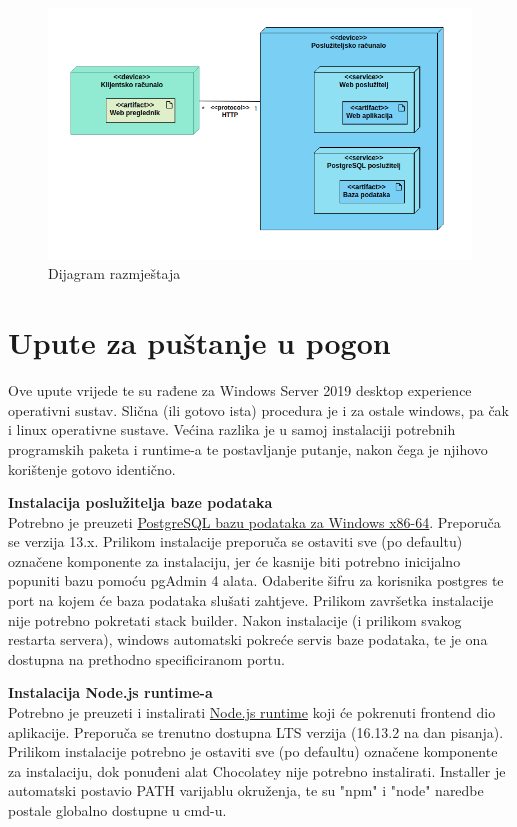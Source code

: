 \begin{figure}[H]
	\centering
	\includegraphics[width=\textwidth, scale=0.5]{dijagrami/dijagram_razmjestaja}
	\caption{Dijagram razmještaja}
	\label{fig:dijagram_razmještaja}
\end{figure}
\eject
	
			
		
		\section{Upute za puštanje u pogon}
		
		Ove upute vrijede te su rađene za Windows Server 2019 desktop experience operativni sustav. Slična (ili gotovo ista) procedura je i za ostale windows, pa čak i linux operativne sustave. Većina razlika je u samoj instalaciji potrebnih programskih paketa i runtime-a te postavljanje putanje, nakon čega je njihovo korištenje gotovo identično.
		
			\textbf{Instalacija poslužitelja baze podataka}\\
			Potrebno je preuzeti \href{https://www.enterprisedb.com/downloads/postgres-postgresql-downloads}{PostgreSQL bazu podataka za Windows x86-64}. Preporuča se verzija 13.x. Prilikom instalacije preporuča se ostaviti sve (po defaultu) označene komponente za instalaciju, jer će kasnije biti potrebno inicijalno popuniti bazu pomoću pgAdmin 4 alata. Odaberite šifru za korisnika postgres te port na kojem će baza podataka slušati zahtjeve. Prilikom završetka instalacije nije potrebno pokretati stack builder. Nakon instalacije (i prilikom svakog restarta servera), windows automatski pokreće servis baze podataka, te je ona dostupna na prethodno specificiranom portu.
			
			\textbf{Instalacija Node.js runtime-a}\\
			Potrebno je preuzeti i instalirati \href{https://nodejs.org/en/download/}{Node.js runtime} koji će pokrenuti frontend dio aplikacije. Preporuča se trenutno dostupna LTS verzija (16.13.2 na dan pisanja). Prilikom instalacije potrebno je ostaviti sve (po defaultu) označene komponente za instalaciju, dok ponuđeni alat Chocolatey nije potrebno instalirati. Installer je automatski postavio PATH varijablu okruženja, te su "npm" i "node" naredbe postale globalno dostupne u cmd-u.
			
